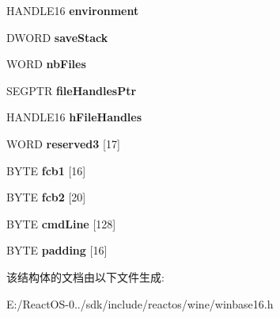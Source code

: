 \begin{DoxyCompactItemize}
H\+A\+N\+D\+L\+E16 {\bfseries environment}
\item 
\mbox{\label{struct_p_d_b16_ab4e7871ad3e3b9199cffd61be513ec91}} 
D\+W\+O\+RD {\bfseries save\+Stack}
\item 
\mbox{\label{struct_p_d_b16_aea7ac8e8db20b6f836edb181e2d77b68}} 
W\+O\+RD {\bfseries nb\+Files}
\item 
\mbox{\label{struct_p_d_b16_af62d0ba18bcb602958a6edaeeb9930aa}} 
S\+E\+G\+P\+TR {\bfseries file\+Handles\+Ptr}
\item 
\mbox{\label{struct_p_d_b16_a7bdbf11f2cf2c1cce390313b23a8710f}} 
H\+A\+N\+D\+L\+E16 {\bfseries h\+File\+Handles}
\item 
\mbox{\label{struct_p_d_b16_a2d62563d8d3598c33c474bc8b30f31ba}} 
W\+O\+RD {\bfseries reserved3} \mbox{[}17\mbox{]}
\item 
\mbox{\label{struct_p_d_b16_ac2101f9e3f058ed4dbceffe5716a15f9}} 
B\+Y\+TE {\bfseries fcb1} \mbox{[}16\mbox{]}
\item 
\mbox{\label{struct_p_d_b16_a1f8f3e0617c48e5a9ba72f97f2ccfc43}} 
B\+Y\+TE {\bfseries fcb2} \mbox{[}20\mbox{]}
\item 
\mbox{\label{struct_p_d_b16_ad3d5756a3915d416dda32a6d634ec84e}} 
B\+Y\+TE {\bfseries cmd\+Line} \mbox{[}128\mbox{]}
\item 
\mbox{\label{struct_p_d_b16_a5a3e53363ce8de8cb42b405449135aad}} 
B\+Y\+TE {\bfseries padding} \mbox{[}16\mbox{]}
\end{DoxyCompactItemize}


该结构体的文档由以下文件生成\+:\begin{DoxyCompactItemize}
\item 
E\+:/\+React\+O\+S-\/0../sdk/include/reactos/wine/winbase16.\+h\end{DoxyCompactItemize}
